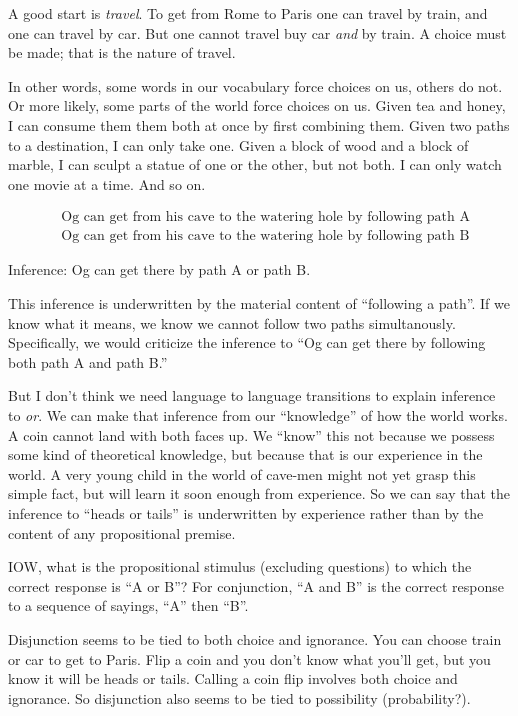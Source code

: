 \documentclass{article}
\begin{document}
A good start is \textit{travel}. To get from Rome to Paris one can
travel by train, and one can travel by car. But one cannot travel buy
car \textit{and} by train. A choice must be made; that is the nature
of travel.

In other words, some words in our vocabulary force choices on us,
others do not. Or more likely, some parts of the world force choices
on us. Given tea and honey, I can consume them them both at once by
first combining them. Given two paths to a destination, I can only
take one. Given a block of wood and a block of marble, I can sculpt a
statue of one or the other, but not both. I can only watch one movie
at a time. And so on.

\begin{align}
 & \text{Og can get from his cave to the watering hole by following path A} \\
 & \text{Og can get from his cave to the watering hole by following path B}
\end{align}

Inference: Og can get there by path A or path B.

This inference is underwritten by the material content of ``following
a path''. If we know what it means, we know we cannot follow two paths
simultanously. Specifically, we would criticize the inference to ``Og
can get there by following both path A and path B.''

But I don't think we need language to language transitions to explain
inference to \textit{or}. We can make that inference from our
\enquote{knowledge} of how the world works. A coin cannot land with both
faces up. We ``know'' this not because we possess some kind of
theoretical knowledge, but because that is our experience in the
world. A very young child in the world of cave-men might not yet grasp
this simple fact, but will learn it soon enough from experience. So we
can say that the inference to ``heads or tails'' is underwritten by
experience rather than by the content of any propositional premise.

IOW, what is the propositional stimulus (excluding questions) to which
the correct response is ``A or B''? For conjunction, ``A and B'' is the
correct response to a sequence of sayings, ``A'' then ``B''.

Disjunction seems to be tied to both choice and ignorance. You can
choose train or car to get to Paris. Flip a coin and you don't know
what you'll get, but you know it will be heads or tails. Calling a
coin flip involves both choice and ignorance. So disjunction also
seems to be tied to possibility (probability?).
\end{document}
